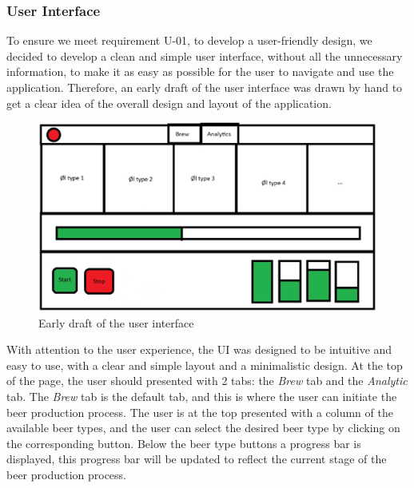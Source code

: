 \subsubsection{User Interface}
To ensure we meet requirement U-01, to develop a user-friendly design, we decided to develop a clean and simple user interface, without all the unnecessary information, to make it as easy as possible for the user to navigate and use the application. \newline
Therefore, an early draft of the user interface was drawn by hand to get a clear idea of the overall design and layout of the application. \newline
\begin{center}
  \centering
  \begin{figure}[H]
      \includegraphics[width=1\textwidth]{img/frontend-draft.png}
      \caption{Early draft of the user interface}
      \label{fig:Frontend_draft}
  \end{figure}
\end{center}
With attention to the user experience, the UI was designed to be intuitive and easy to use, with a clear and simple layout and a minimalistic design. \newline
At the top of the page, the user should presented with 2 tabs: the \textit{Brew} tab and the \textit{Analytic} tab.  \newline
The \textit{Brew} tab is the default tab, and this is where the user can initiate the beer production process. \newline
The user is at the top presented with a column of the available beer types, and the user can select the desired beer type by clicking on the corresponding button. \newline
Below the beer type buttons a progress bar is displayed, this progress bar will be updated to reflect the current stage of the beer production process. \newline
